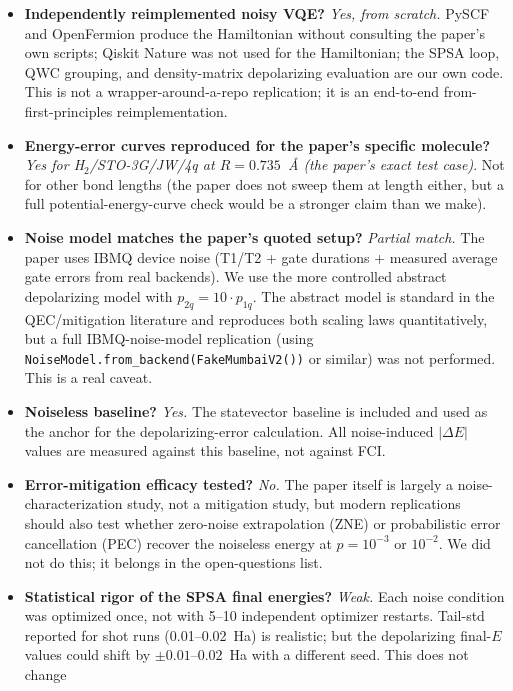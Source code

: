 \documentclass[11pt]{article}
\begin{document}
\begin{itemize}
  \item \textbf{Independently reimplemented noisy VQE?} \emph{Yes, from
    scratch.} PySCF and OpenFermion produce the Hamiltonian without
    consulting the paper's own scripts; Qiskit Nature was not used for
    the Hamiltonian; the SPSA loop, QWC grouping, and density-matrix
    depolarizing evaluation are our own code. This is not a wrapper-around-a-repo
    replication; it is an end-to-end from-first-principles reimplementation.
  \item \textbf{Energy-error curves reproduced for the paper's specific
    molecule?} \emph{Yes for H$_2$/STO-3G/JW/4q at $R{=}0.735$~\AA{}
    (the paper's exact test case)}. Not for other bond lengths (the paper
    does not sweep them at length either, but a full potential-energy-curve
    check would be a stronger claim than we make).
  \item \textbf{Noise model matches the paper's quoted setup?} \emph{Partial
    match.} The paper uses IBMQ device noise (T1/T2 + gate durations +
    measured average gate errors from real backends). We use the more
    controlled abstract depolarizing model with $p_{2q}=10\cdot p_{1q}$.
    The abstract model is standard in the QEC/mitigation literature and
    reproduces both scaling laws quantitatively, but a full IBMQ-noise-model
    replication (using \texttt{NoiseModel.from\_backend(FakeMumbaiV2())} or
    similar) was not performed. This is a real caveat.
  \item \textbf{Noiseless baseline?} \emph{Yes.} The statevector baseline
    is included and used as the anchor for the depolarizing-error
    calculation. All noise-induced $|\Delta E|$ values are measured
    against this baseline, not against FCI.
  \item \textbf{Error-mitigation efficacy tested?} \emph{No.} The paper
    itself is largely a noise-characterization study, not a mitigation
    study, but modern replications should also test whether zero-noise
    extrapolation (ZNE) or probabilistic error cancellation (PEC) recover
    the noiseless energy at $p{=}10^{-3}$ or $10^{-2}$. We did not do this;
    it belongs in the open-questions list.
  \item \textbf{Statistical rigor of the SPSA final energies?} \emph{Weak.}
    Each noise condition was optimized once, not with 5--10 independent
    optimizer restarts. Tail-std reported for shot runs (0.01--0.02~Ha)
    is realistic; but the depolarizing final-$E$ values could shift by
    $\pm 0.01$--$0.02$~Ha with a different seed. This does not change

\end{itemize}
\end{document}
